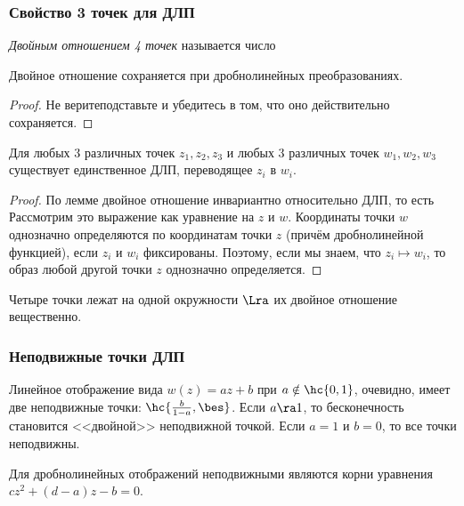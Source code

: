 \documentclass[a4paper]{article}
\begin{document}
\subsubsection{Свойство 3 точек для ДЛП}

\begin{df}
\emph{Двойным отношением 4 точек} называется число
\end{df}

\begin{lemma}
Двойное отношение сохраняется при дробно\д линейных преобразованиях.
\end{lemma}
\begin{proof}
Не верите\т подставьте и убедитесь в том, что оно действительно сохраняется.
\end{proof}

\begin{theorem}
Для любых 3 различных точек $z_1, z_2, z_3$ и любых 3 различных точек $w_1, w_2, w_3$ существует единственное
ДЛП, переводящее $z_i$ в $w_i$.
\end{theorem}
\begin{proof}
По лемме двойное отношение инвариантно относительно ДЛП, то есть
Рассмотрим это выражение как уравнение на $z$ и $w$. Координаты точки $w$ однозначно определяются по координатам
точки $z$ (причём дробно\д линейной функцией), если $z_i$ и $w_i$ фиксированы. Поэтому, если мы знаем,
что $z_i\mapsto w_i$, то образ любой другой точки $z$ однозначно определяется.
\end{proof}

\begin{problem}
Четыре точки лежат на одной окружности $\Lra$ их двойное отношение вещественно.
\end{problem}

\subsubsection{Неподвижные точки ДЛП}

Линейное отображение вида $w(z) = az+b$ при $a\notin\hc{0,1}$, очевидно, имеет две
неподвижные точки: $\hc{\frac{b}{1-a},\bes}$. Если $a\ra 1$, то бесконечность становится <<двойной>> неподвижной точкой.
Если $a=1$ и $b=0$, то  все точки неподвижны.

Для дробно\д линейных отображений неподвижными являются корни уравнения $cz^2 + (d-a)z-b=0$.
\end{document}
